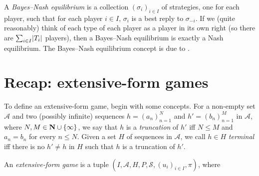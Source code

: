 \documentclass[11pt,letterpaper,reqno,oneside]{book}
\begin{document}
A \emph{Bayes--Nash equilibrium} is a collection $(\sigma_i)_{i \in I}$ of strategies, one for each player, such that for each player $i \in I$, $\sigma_i$ is a best reply to $\sigma_{-i}$. If we (quite reasonably) think of each type of each player as a player in its own right (so there are $\sum_{i \in I} \abs*{T_i}$ players), then a Bayes--Nash equilibrium is exactly a Nash equilibrium. The Bayes--Nash equilibrium concept is due to \textcite{Harsanyi1967,Harsanyi1968a,Harsanyi1968b}.



\section{Recap: extensive-form games}
\label{ch0:extensive}

To define an extensive-form game, begin with some concepts. For a non-empty set $\mathcal{A}$ and two (possibly infinite) sequences $h = (a_n)_{n=1}^N$ and $h' = (b_n)_{n=1}^M$ in $\mathcal{A}$, where $N,M \in \mathbf{N} \cup \{\infty\}$, we say that $h$ is a \emph{truncation} of $h'$ iff $N \leq M$ and $a_n = b_n$ for every $n \leq N$. Given a set $H$ of sequences in $\mathcal{A}$, we call $h \in H$ \emph{terminal} iff there is no $h' \neq h$ in $H$ such that $h$ is a truncation of $h'$.

An \emph{extensive-form game} is a tuple $(I,\mathcal{A},H,P,\mathcal{S},(u_i)_{i \in I},\pi)$, where
\end{document}

